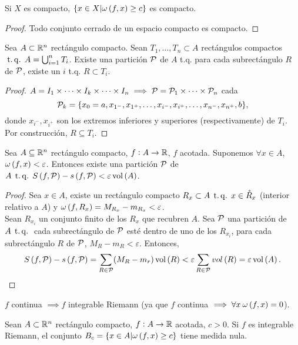 \begin{col*}
    \label{col:lebesgue}
    Si $X$ es compacto, $\{x \in X | \omega \left( f, x \right) \geq c\}$ es compacto.
\end{col*}
\begin{proof}
    Todo conjunto cerrado de un espacio compacto es compacto.
\end{proof}
\begin{lema}\label{lema:teo_lebesgue}
    Sea $A \subset \mathbb{R}^n$ rectángulo compacto. Sean $T_1, \dots, T_n \subset A$ rectángulos compactos $\operatorname{\;t.q.\;} A = \bigcup_{i=1}^n T_i$. Existe una partición $\mathcal{P}$ de $A$ t.q. para cada subrectángulo $R$ de $\mathcal{P}$, existe un $i$ t.q. $R \subset T_i$.
\end{lema}
\begin{proof}
    $A = I_1 \times \dots \times I_k \times \dots \times I_n \implies \mathcal{P} = \mathcal{P}_1 \times \dots \times \mathcal{P}_n$ cada
    \[ \mathcal{P}_k = \{x_0 = a, x_{1^-}, x_{1^+}, \dots, x_{i^-}, x_{i^+}, \dots, x_{n^-}, x_{n^+}, b\}, \]
    donde $x_{i^-}, x_{i^+}$ son los extremos inferiores y superiores (respectivamente) de $T_i$. Por construcción, $R \subseteq T_i$.
\end{proof}
\begin{lema*}\label{lema:uno_lebesgue}
    Sea $A \subseteq \mathbb{R}^n$ rectángulo compacto, $f : A \to \mathbb{R}$, $f$ acotada. Suponemos $\forall x  \in A$, $\omega \left( f, x \right) < \varepsilon$. Entonces existe una partición $\mathcal{P}$ de $A \operatorname{\;t.q.\;} S \left( f, \mathcal{P} \right) - s \left( f, \mathcal{P} \right) < \varepsilon \operatorname{vol} \left( A \right)$.
\end{lema*}
\begin{proof}
    Sea $x \in A$, existe un rectángulo compacto $R_x \subset A \operatorname{\;t.q.\;} x \in \mathring{R}_x$ (interior relativo a $A$) y $\omega \left( f, R_x \right) = M_{R_x} - m_{R_x} < \varepsilon$. \\
    Sean $R_{x_i}$ un conjunto finito de los $R_x$ que recubren $A$. Sea $\mathcal{P}$ una partición de $A \operatorname{\;t.q.\;}$ cada subrectángulo de $\mathcal{P}$ esté dentro de uno de los $R_{x_i}$, para cada subrectángulo $R$ de $\mathcal{P}$, $M_R - m_R < \varepsilon$. Entonces,
    \[ S \left( f,\mathcal{P} \right) - s \left( f,\mathcal{P} \right) = \sum_{R \in \mathcal{P}} (M_R - m_r) \operatorname{vol} \left( R \right) < \varepsilon \sum_{R \in \mathcal{P}} vol \left( R \right) = \varepsilon \operatorname{vol} \left( A \right). \]
\end{proof}
\begin{col*}
    $f$ continua $\implies f$ integrable Riemann (ya que $f$ continua $\implies \forall x \: \omega \left( f, x \right) = 0$).
\end{col*}
\begin{lema*}[2]\label{lema:dos_lebesgue}
    Sean $A \subset \mathbb{R}^n$ rectángulo compacto, $f : A \to \mathbb{R}$ acotada, $c > 0$. Si $f$ es integrable Riemann, el conjunto $B_c = \{x \in A | \omega \left( f, x \right) \geq c\}$ tiene medida nula.
\end{lema*}
